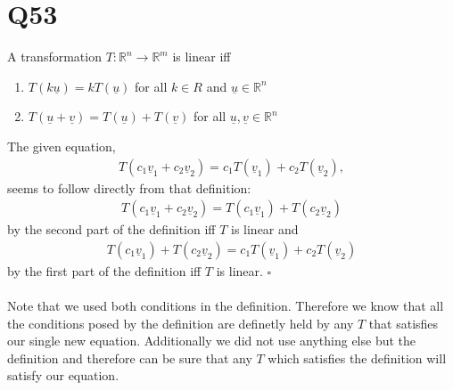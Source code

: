 \documentclass{article}
\renewcommand{\vec}{\underline}
\begin{document}
\section*{Q53}
A transformation $T:\mathbb{R}^n\to\mathbb{R}^m$ is linear iff
\begin{enumerate}
    \item $T(k\vec u) = kT(\vec u)$ for all $k\in R$ and $\vec u\in\mathbb{R}^n$
    \item $T(\vec u + \vec v) = T(\vec u) + T(\vec v)$ for all $\vec u, \vec v \in\mathbb{R}^n$
\end{enumerate}
The given equation, 
\begin{align*}
    T(c_1\vec v_1 + c_2\vec v_2) = c_1T(\vec v_1) + c_2T(\vec v_2),
\end{align*}
seems to follow directly from that definition:
\begin{align*}
    T(c_1\vec v_1 + c_2\vec v_2) = T(c_1\vec v_1) + T(c_2\vec v_2)
\end{align*}
by the second part of the definition iff $T$ is linear and
\begin{align*}
    T(c_1\vec v_1) + T(c_2\vec v_2) = c_1T(\vec v_1) + c_2T(\vec v_2)
\end{align*}
by the first part of the definition iff $T$ is linear. $\square$\\\\
Note that we used both conditions in the definition. Therefore we know that all the conditions posed by the definition are definetly held by any $T$ that satisfies our single new equation. Additionally we did not use anything else but the definition and therefore can be sure that any $T$ which satisfies the definition will satisfy our equation.
\end{document}
